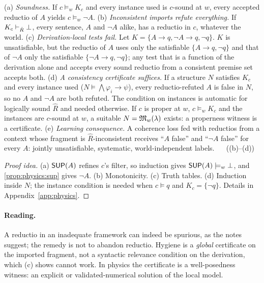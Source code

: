 \begin{theorem}\label{thm:physics:hygiene}
\textup{(a)} \emph{Soundness.} If $c\models_w K_c$ and every instance used is $c$-sound at
$w$, every accepted reductio of $A$ yields $c\models_w\neg A$. \textup{(b)}
\emph{Inconsistent imports refute everything.} If $K_c\vdash_{\hat R}\bot$, every sentence,
$A$ and $\neg A$ alike, has a reductio in $c$, whatever the world. \textup{(c)}
\emph{Derivation-local tests fail.} Let $K=\{A\to q,\neg A\to q,\neg q\}$. $K$ is
unsatisfiable, but the reductio of $A$ uses only the satisfiable $\{A\to q,\neg q\}$ and
that of $\neg A$ only the satisfiable $\{\neg A\to q,\neg q\}$; any test that is a function
of the derivation alone and accepts every sound reductio from a consistent premise set
accepts both. \textup{(d)} \emph{A consistency certificate suffices.} If a structure $N$
satisfies $K_c$ and every instance used ($N\models\bigwedge\varphi_i\to\psi$), every
reductio-refuted $A$ is false in $N$, so no $A$ and $\neg A$ are both refuted. The
condition on instances is automatic for logically sound $\hat R$ and needed otherwise. If
$c$ is proper at $w$, $c\models_w K_c$ and the instances are
$c$-sound at $w$, a suitable $N=\mathfrak{M}_w(\lambda)$ exists: a properness witness is a
certificate. \textup{(e)} \emph{Learning consequence.} A coherence loss fed with reductios
from a context whose fragment is $\hat R$-inconsistent receives ``$A$ false'' and ``$\neg A$
false'' for every $A$: jointly unsatisfiable, systematic, world-independent labels.
\hfill{}\ \  ((b)--(d))
\end{theorem}
\begin{proof}[Proof idea]
(a) $\mathsf{SUP}(A)$ refines $c$'s filter, so induction gives $\mathsf{SUP}(A)\models_w\bot$, and
\cref{prop:physics:sup} gives $\neg A$. (b) Monotonicity. (c) Truth tables. (d) Induction
inside $N$; the instance condition is needed when $c\models q$ and $K_c=\{\neg q\}$. Details
in Appendix~\ref{app:physics}.
\end{proof}

\paragraph{Reading.} A reductio in an inadequate framework can indeed be spurious, as the
notes suggest; the remedy is not to abandon reductio. Hygiene is a \emph{global}
certificate on the imported fragment, not a syntactic relevance condition on the
derivation, which (c) shows cannot work. In physics the certificate is a well-posedness
witness: an explicit or validated-numerical solution of the local model.

